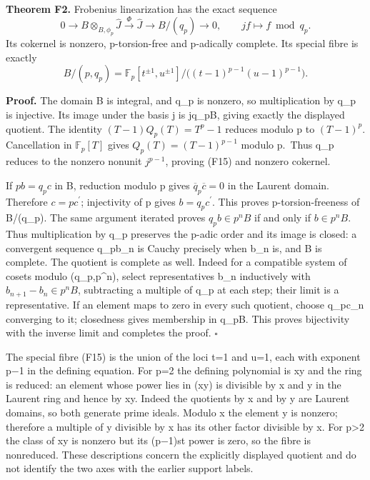 \documentclass[
]{article}
\begin{document}
\textbf{Theorem F2.} Frobenius linearization has the exact sequence \[
0\longrightarrow B\otimes_{B,\phi_p}\widehat J
\xrightarrow{\Phi}\widehat J
\longrightarrow B/(q_p)\longrightarrow0,
\qquad jf\longmapsto f\bmod q_p.
\tag{F14}
\] Its cokernel is nonzero, p-torsion-free and p-adically complete. Its
special fibre is exactly \[
B/(p,q_p)=
\mathbb F_p[t^{\pm1},u^{\pm1}]
/\bigl((t-1)^{p-1}(u-1)^{p-1}\bigr).
\tag{F15}
\]

\textbf{Proof.} The domain B is integral, and q\_p is nonzero, so
multiplication by q\_p is injective. Its image under the basis j is
jq\_pB, giving exactly the displayed quotient. The identity
\((T-1)Q_p(T)=T^p-1\) reduces modulo p to \((T-1)^p\). Cancellation in
\(\mathbb F_p[T]\) gives \(Q_p(T)=(T-1)^{p-1}\) modulo p.~Thus q\_p
reduces to the nonzero nonunit \(j^{p-1}\), proving (F15) and nonzero
cokernel.

If \(pb=q_pc\) in B, reduction modulo p gives
\(\overline q_p\overline c=0\) in the Laurent domain. Therefore
\(c=pc^{\prime}\); injectivity of p gives \(b=q_pc^{\prime}\). This
proves p-torsion-freeness of B/(q\_p). The same argument iterated proves
\(q_pb\in p^nB\) if and only if \(b\in p^nB\). Thus multiplication by
q\_p preserves the p-adic order and its image is closed: a convergent
sequence q\_pb\_n is Cauchy precisely when b\_n is, and B is complete.
The quotient is complete as well. Indeed for a compatible system of
cosets modulo (q\_p,p\^{}n), select representatives b\_n inductively
with \(b_{n+1}-b_n\in p^nB\), subtracting a multiple of q\_p at each
step; their limit is a representative. If an element maps to zero in
every such quotient, choose q\_pc\_n converging to it; closedness gives
membership in q\_pB. This proves bijectivity with the inverse limit and
completes the proof. \(\square\)

The special fibre (F15) is the union of the loci t=1 and u=1, each with
exponent p−1 in the defining equation. For p=2 the defining polynomial
is xy and the ring is reduced: an element whose power lies in (xy) is
divisible by x and y in the Laurent ring and hence by xy. Indeed the
quotients by x and by y are Laurent domains, so both generate prime
ideals. Modulo x the element y is nonzero; therefore a multiple of y
divisible by x has its other factor divisible by x. For p\textgreater2
the class of xy is nonzero but its (p−1)st power is zero, so the fibre
is nonreduced. These descriptions concern the explicitly displayed
quotient and do not identify the two axes with the earlier support
labels.
\end{document}
